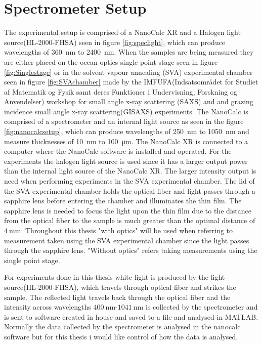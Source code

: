 \documentclass[MasterThesisMain.tex]{subfiles}
\begin{document}
\section{Spectrometer Setup}
The experimental setup is comprised of a NanoCalc XR and a Halogen light source(HL-2000-FHSA) seen in figure \ref{fig:speclight}, which can produce wavelengths of \SI{360}{\nano\meter} to \SI{2400}{\nano\meter}. When the samples are being measured they are either placed on the ocean optics single point stage seen in figure \ref{fig:Singlestage} or in the solvent vapour annealing (SVA) experimental chamber seen in figure \ref{fig:SVAchamber} made by the IMFUFA(Indsatsområdet for Studiet af Matematik og Fysik samt deres Funktioner i Undervisning, Forskning og Anvendelser) workshop for small angle x-ray scattering (SAXS) and and grazing incidence small angle x-ray scattering(GISAXS) experiments. The NanoCalc is comprised of a spectrometer and an internal light source as seen in the figure \ref{fig:nanocalcsetup}, which can produce wavelengths of \SI{250}{\nano\meter} to \SI{1050}{\nano\meter} and measure thicknesses of \SI{10}{\nano\meter} to \SI{100}{\micro\meter}. The NanoCalc XR is connected to a computer where the NanoCalc software is installed and operated. For the experiments the halogen light source is used since it has a larger output power than the internal light source of the NanoCalc XR. The larger intensity output is need when performing experiments in the SVA experimental chamber. The lid of the SVA experimental chamber holds the optical fiber and light passes through a sapphire lens before entering the chamber and illuminates the thin film. The sapphire lens is needed to focus the light upon the thin film due to the distance from the optical fiber to the sample is much greater than the optimal distance of $\SI{4}{\milli\meter}$. Throughout this thesis "with optics" will be used when referring to measurement taken using the SVA experimental chamber since the light passes through the sapphire lens. "Without optics" refers taking measurements using the single point stage.  

For experiments done in this thesis white light is produced by the light source(HL-2000-FHSA), which travels through optical fiber and strikes the sample. The reflected light travels back through the optical fiber and the intensity across wavelengths $\SI{400}{\nano\meter}$-$\SI{1041}{\nano\meter}$ is collected by the spectrometer and is sent to software created in house and saved to a file and analysed in MATLAB\textsuperscript{\textregistered}. Normally the data collected by the spectrometer is analysed in the nanocalc software but for this thesis i would like control of how the data is analysed.  
	
\end{document}
